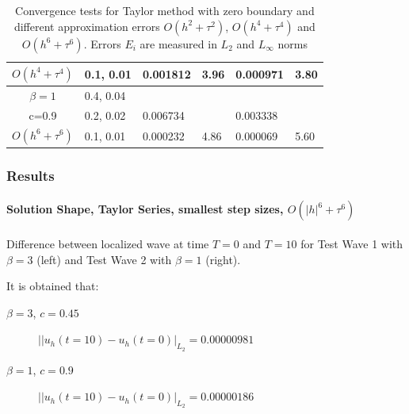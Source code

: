 \documentclass{beamer}
\begin{document}
\begin{frame}
\begin{table}[ht]
{\begin{tabular}{||c|l|ll|ll||}
       $O(h^4+ \tau^4)$ &0.1, 0.01   &0.001812 & 3.96  & 0.000971  & 3.80  \\
    \hline
  $\beta=1$     &0.4, 0.04   &            &          &                  &      \\
      c=0.9                    &0.2, 0.02   &0.006734 &           & 0.003338      &       \\
     $O(h^6+ \tau^6)$ &0.1, 0.01 & 0.000232 &4.86 & 0.000069  & 5.60        \\
	   \hline
			\hline 
		\end{tabular}
		}%
		\caption{Convergence tests for Taylor method with zero boundary and different approximation errors $O(h^{2} + \tau^2 )$, $O(h^{4} + \tau^4 )$ and $O(h^{6} + \tau^6 )$. Errors $E_i$ are measured in $L_2$ and $L_\infty$ norms}
\label{table:A}
\end{table}

\end{frame}



\begin{frame}
\frametitle{Results}
\framesubtitle{Solution Shape, Taylor Series, smallest step sizes, $O(|h|^6+\tau^6)$}


Difference between localized wave at time $T=0$ and $T=10$ for Test Wave 1 with $\beta =3$  (left) and Test Wave 2 with $\beta=1$ (right). 

It is obtained that:
\begin{description}
 \item[$\beta = 3$, $c = 0.45$] $||u_h(t=10)-u_h(t=0)|_{L_2} =  0.00000981$
 \item[$\beta = 1$, $c = 0.9$] $||u_h(t=10)-u_h(t=0)|_{L_2} = 0.00000186$
\end{description}
\end{frame}

\end{document}
